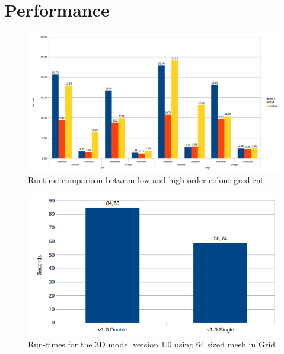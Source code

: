 \documentclass[12pt, openany]{book}
\begin{document}
{}



\appendix
\chapter{Performance}\label{app:perfo}
  \begin{figure}[H]
  	\centering
  	\includegraphics[width=\linewidth]{Resources/Images/highComp.png}
  	\caption{Runtime comparison between low and high order colour gradient}
  	\label{fig:highComp}
  \end{figure}
    \begin{figure}[H]
    	\centering
    	\includegraphics[width=\linewidth]{Resources/Images/v13d64.png}
    	\caption{Run-times for the 3D model version 1.0 using 64 sized mesh in Grid}
    	\label{fig:v13d64}
    \end{figure}
\end{document}
